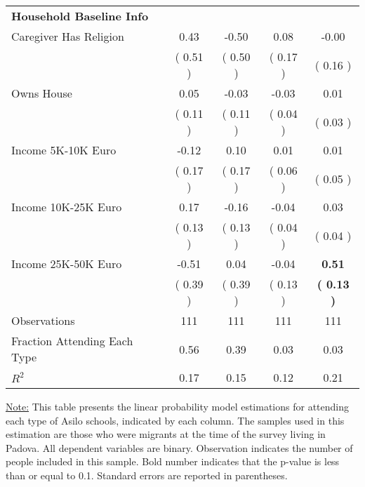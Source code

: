 \begin{table}[H]
{\begin{tabular}{lcccc}
\midrule
\textbf{Household Baseline Info} \\
\quad Caregiver Has Religion &      0.43 &     -0.50 &      0.08 &     -0.00 \\
\quad  & (     0.51 ) & (     0.50 )  & (     0.17 )  & (     0.16 )  \\
\quad Owns House &      0.05 &     -0.03 &     -0.03 &      0.01 \\
\quad  & (     0.11 ) & (     0.11 )  & (     0.04 )  & (     0.03 )  \\
\quad Income 5K-10K Euro &     -0.12 &      0.10 &      0.01 &      0.01 \\
\quad  & (     0.17 ) & (     0.17 )  & (     0.06 )  & (     0.05 )  \\
\quad Income 10K-25K Euro &      0.17 &     -0.16 &     -0.04 &      0.03 \\
\quad  & (     0.13 ) & (     0.13 )  & (     0.04 )  & (     0.04 )  \\
\quad Income 25K-50K Euro &     -0.51 &      0.04 &     -0.04 & \textbf{     0.51} \\
\quad  & (     0.39 ) & (     0.39 )  & (     0.13 )  & \textbf{(     0.13 )}  \\
\midrule
Observations & 111 & 111 & 111 & 111 \\
Fraction Attending Each Type &      0.56 &      0.39 &      0.03 &      0.03 \\
\midrule
$ R^2$ &      0.17 &      0.15 &      0.12 &      0.21 \\
\bottomrule
\end{tabular}}
\end{table}
\begin{scriptsize}
\noindent\underline{Note:} This table presents the linear probability model estimations for attending each type of Asilo schools, indicated by each column. The samples used in this estimation are those who were migrants at the time of the survey living in Padova. All dependent variables are binary. Observation indicates the number of people included in this sample. Bold number indicates that the p-value is less than or equal to 0.1. Standard errors are reported in parentheses.
\end{scriptsize}
